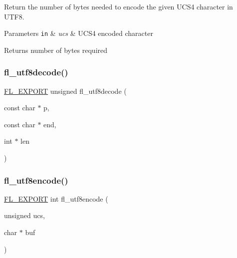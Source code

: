 Return the number of bytes needed to encode the given U\+C\+S4 character in U\+T\+F8. 
\begin{DoxyParams}[1]{Parameters}
\mbox{\tt in}  & {\em ucs} & U\+C\+S4 encoded character \\
\hline
\end{DoxyParams}
\begin{DoxyReturn}{Returns}
number of bytes required 
\end{DoxyReturn}
\mbox{\label{group__fl__unicode_ga5ee17a469c66cfe3030e10af73132f71}} 
\subsubsection{\texorpdfstring{fl\+\_\+utf8decode()}{fl\_utf8decode()}}
{\footnotesize\ttfamily \hyperlink{_fl___export_8_h_aa9ba29a18aee9d738370a06eeb4470fc}{F\+L\+\_\+\+E\+X\+P\+O\+RT} unsigned fl\+\_\+utf8decode (\begin{DoxyParamCaption}\item[{const char $\ast$}]{p,  }\item[{const char $\ast$}]{end,  }\item[{int $\ast$}]{len }\end{DoxyParamCaption})}

\mbox{\label{group__fl__unicode_ga04b040e4adb278feddd1c32000da50a8}} 
\subsubsection{\texorpdfstring{fl\+\_\+utf8encode()}{fl\_utf8encode()}}
{\footnotesize\ttfamily \hyperlink{_fl___export_8_h_aa9ba29a18aee9d738370a06eeb4470fc}{F\+L\+\_\+\+E\+X\+P\+O\+RT} int fl\+\_\+utf8encode (\begin{DoxyParamCaption}\item[{unsigned}]{ucs,  }\item[{char $\ast$}]{buf }\end{DoxyParamCaption})}

